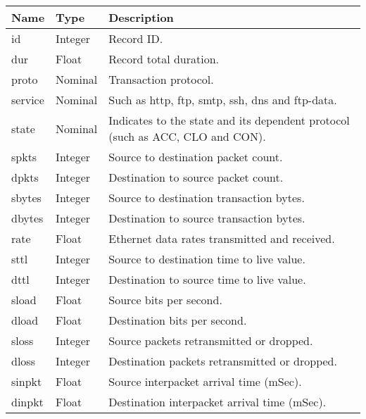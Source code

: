 \documentclass[
  a4paper,
]{scrreprt}
\begin{document}
\begin{supptbl}
{\begin{longtable*}[]{@{}
  >{\raggedright\arraybackslash}p{(\linewidth - 4\tabcolsep) * }
  >{\raggedright\arraybackslash}p{(\linewidth - 4\tabcolsep) * }
  >{\raggedright\arraybackslash}p{(\linewidth - 4\tabcolsep) * }@{}}
\toprule\noalign{}
\begin{minipage}[b]{\linewidth}\raggedright
Name
\end{minipage} & \begin{minipage}[b]{\linewidth}\raggedright
Type
\end{minipage} & \begin{minipage}[b]{\linewidth}\raggedright
Description
\end{minipage} \\
\midrule\noalign{}
\endhead
\bottomrule\noalign{}
\endlastfoot
id & Integer & Record ID. \\
dur & Float & Record total duration. \\
proto & Nominal & Transaction protocol. \\
service & Nominal & Such as http, ftp, smtp, ssh, dns and ftp-data. \\
state & Nominal & Indicates to the state and its dependent protocol
(such as ACC, CLO and CON). \\
spkts & Integer & Source to destination packet count. \\
dpkts & Integer & Destination to source packet count. \\
sbytes & Integer & Source to destination transaction bytes. \\
dbytes & Integer & Destination to source transaction bytes. \\
rate & Float & Ethernet data rates transmitted and received. \\
sttl & Integer & Source to destination time to live value. \\
dttl & Integer & Destination to source time to live value. \\
sload & Float & Source bits per second. \\
dload & Float & Destination bits per second. \\
sloss & Integer & Source packets retransmitted or dropped. \\
dloss & Integer & Destination packets retransmitted or dropped. \\
sinpkt & Float & Source interpacket arrival time (mSec). \\
dinpkt & Float & Destination interpacket arrival time (mSec). \\

\end{longtable*}}
\end{supptbl}
\end{document}
